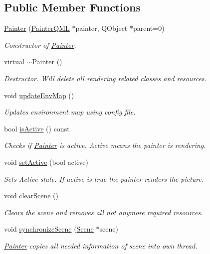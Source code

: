 \subsection*{Public Member Functions}
\begin{DoxyCompactItemize}
\item 
\hyperlink{class_painter_ae9520672fc113fc60cf942ba3d13a46e}{Painter} (\hyperlink{class_painter_q_m_l}{Painter\+Q\+M\+L} $\ast$painter, Q\+Object $\ast$parent=0)
\begin{DoxyCompactList}\small\item\em Constructor of \hyperlink{class_painter}{Painter}. \end{DoxyCompactList}\item 
virtual \hyperlink{class_painter_a6db88212368910da3385fa9e5fa97174}{$\sim$\+Painter} ()
\begin{DoxyCompactList}\small\item\em Destructor. Will delete all rendering related classes and resources. \end{DoxyCompactList}\item 
void \hyperlink{class_painter_a3af62665915b5f5380e7009c18862e7e}{update\+Env\+Map} ()
\begin{DoxyCompactList}\small\item\em Updates environment map using config file. \end{DoxyCompactList}\item 
bool \hyperlink{class_painter_addfa0fd4dd943d27c67b62dfc9ab3a0b}{is\+Active} () const 
\begin{DoxyCompactList}\small\item\em Checks if \hyperlink{class_painter}{Painter} is active. Active means the painter is rendering. \end{DoxyCompactList}\item 
void \hyperlink{class_painter_a7dd43be8d3e1eab98035fcc23316bd1a}{set\+Active} (bool active)
\begin{DoxyCompactList}\small\item\em Sets Active state. If active is true the painter renders the picture. \end{DoxyCompactList}\item 
void \hyperlink{class_painter_a37014617684597b602522d3de20f8f41}{clear\+Scene} ()
\begin{DoxyCompactList}\small\item\em Clears the scene and removes all not anymore required resources. \end{DoxyCompactList}\item 
void \hyperlink{class_painter_a0c7f2b5b2bc7fa8fdfac559cc9b1401d}{synchronize\+Scene} (\hyperlink{class_scene}{Scene} $\ast$scene)
\begin{DoxyCompactList}\small\item\em \hyperlink{class_painter}{Painter} copies all needed information of scene into own thread. \end{DoxyCompactList}\end{DoxyCompactItemize}
